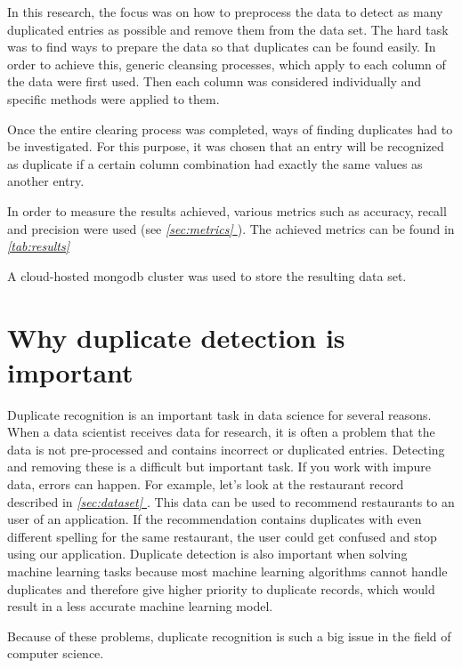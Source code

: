 \documentclass[conference]{IEEEtran}
\newcommand*{\fullref}[1]{\textit{\hyperref[{#1}]{\autoref*{#1} \nameref*{#1}}}}
\begin{document}
In this research, the focus was on how to preprocess the data to detect as many duplicated entries as possible and remove them from the data set. The hard task was to find ways to prepare the data so that duplicates can be found easily. In order to achieve this, generic cleansing processes, which apply to each column of the data were first used. Then each column was considered individually and specific methods were applied to them.

Once the entire clearing process was completed, ways of finding duplicates had to be investigated. For this purpose, it was chosen that an entry will be recognized as duplicate if a certain column combination had exactly the same values as another entry.

In order to measure the results achieved, various metrics such as accuracy, recall and precision were used (see \fullref{sec:metrics}). The achieved metrics can be found in \fullref{tab:results}

A cloud-hosted mongodb cluster was used to store the resulting data set.
\section{Why duplicate detection is important}
Duplicate recognition is an important task in data science for several reasons. When a data scientist receives data for research, it is often a problem that the data is not pre-processed and contains incorrect or duplicated entries. Detecting and removing these is a difficult but important task. If you work with impure data, errors can happen. For example, let's look at the restaurant record described in \fullref{sec:dataset}. This data can be used to recommend restaurants to an user of an application. If the recommendation contains duplicates with even different spelling for the same restaurant, the user could get confused and stop using our application. Duplicate detection is also important when solving machine learning tasks because most machine learning algorithms cannot handle duplicates and therefore give higher priority to duplicate records, which would result in a less accurate machine learning model.

Because of these problems, duplicate recognition is such a big issue in the field of computer science.
\end{document}
